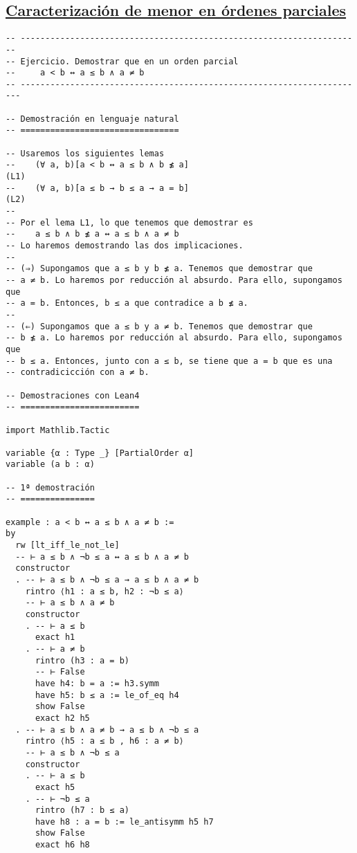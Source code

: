 \subsection{\href{./src/Logica/Caracterizacion\_de\_menor\_en\_ordenes\_parciales.lean}{Caracterización de menor en órdenes parciales}}
\label{sec:org635e17a}
\begin{verbatim}
-- ---------------------------------------------------------------------
-- Ejercicio. Demostrar que en un orden parcial
--     a < b ↔ a ≤ b ∧ a ≠ b
-- ----------------------------------------------------------------------

-- Demostración en lenguaje natural
-- ================================

-- Usaremos los siguientes lemas
--    (∀ a, b)[a < b ↔ a ≤ b ∧ b ≰ a]                               (L1)
--    (∀ a, b)[a ≤ b → b ≤ a → a = b]                               (L2)
--
-- Por el lema L1, lo que tenemos que demostrar es
--    a ≤ b ∧ b ≰ a ↔ a ≤ b ∧ a ≠ b
-- Lo haremos demostrando las dos implicaciones.
--
-- (⇒) Supongamos que a ≤ b y b ≰ a. Tenemos que demostrar que
-- a ≠ b. Lo haremos por reducción al absurdo. Para ello, supongamos que
-- a = b. Entonces, b ≤ a que contradice a b ≰ a.
--
-- (⇐) Supongamos que a ≤ b y a ≠ b. Tenemos que demostrar que
-- b ≰ a. Lo haremos por reducción al absurdo. Para ello, supongamos que
-- b ≤ a. Entonces, junto con a ≤ b, se tiene que a = b que es una
-- contradicicción con a ≠ b.

-- Demostraciones con Lean4
-- ========================

import Mathlib.Tactic

variable {α : Type _} [PartialOrder α]
variable (a b : α)

-- 1ª demostración
-- ===============

example : a < b ↔ a ≤ b ∧ a ≠ b :=
by
  rw [lt_iff_le_not_le]
  -- ⊢ a ≤ b ∧ ¬b ≤ a ↔ a ≤ b ∧ a ≠ b
  constructor
  . -- ⊢ a ≤ b ∧ ¬b ≤ a → a ≤ b ∧ a ≠ b
    rintro ⟨h1 : a ≤ b, h2 : ¬b ≤ a⟩
    -- ⊢ a ≤ b ∧ a ≠ b
    constructor
    . -- ⊢ a ≤ b
      exact h1
    . -- ⊢ a ≠ b
      rintro (h3 : a = b)
      -- ⊢ False
      have h4: b = a := h3.symm
      have h5: b ≤ a := le_of_eq h4
      show False
      exact h2 h5
  . -- ⊢ a ≤ b ∧ a ≠ b → a ≤ b ∧ ¬b ≤ a
    rintro ⟨h5 : a ≤ b , h6 : a ≠ b⟩
    -- ⊢ a ≤ b ∧ ¬b ≤ a
    constructor
    . -- ⊢ a ≤ b
      exact h5
    . -- ⊢ ¬b ≤ a
      rintro (h7 : b ≤ a)
      have h8 : a = b := le_antisymm h5 h7
      show False
      exact h6 h8


\end{verbatim}
